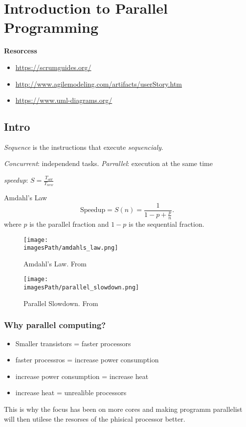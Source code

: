 \chapter{Introduction to Parallel Programming}

\textbf{Resorcess}
\begin{itemize}
    \item \url{https://scrumguides.org/}
    \item \url{http://www.agilemodeling.com/artifacts/userStory.htm}
    \item \url{https://www.uml-diagrams.org/}
\end{itemize}


\section{Intro}
\textit{Sequence} is the instructions that execute \textit{sequencialy}.

\textit{Concurrent}: independend tasks. \textit{Parrallel}: execution at the same time

\textit{speedup}: $S=\frac{T_{old}}{T_{new}}$

Amdahl’s Law
\begin{equation}
  \text{Speedup} = S(n) = \frac{1}{1-p+\frac{p}{n}}.
\end{equation}
where $p$ is the parallel fraction and $1-p$ is the sequential fraction.

\begin{figure}[!ht]
    \centering
    \texttt{[image: \\imagesPath/amdahls\_law.png]}
    \caption{Amdahl’s Law. From~\cite{}}
\end{figure}



\begin{figure}[!ht]
    \centering
    \texttt{[image: \\imagesPath/parallel\_slowdown.png]}
    \caption{Parallel Slowdown. From~\cite{}}
\end{figure}


\newpage
\subsection{Why parallel computing?}
\begin{itemize}
\item Smaller transistors = faster processors
\item faster processros = increase power consumption
\item increase power consumption = increase heat
\item increase heat = unrealible processors
\end{itemize}
This is why the focus has been on more cores and making programm parallelist will then utilese the resorses of the phisical processor better.

